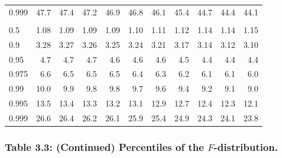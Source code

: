 \documentclass[]{article}
\begin{document}
\begin{table}[H]
\begin{tabular}{lrrrrrrrrrr}
\hspace{1em}0.999 & 47.7 & 47.4 & 47.2 & 46.9 & 46.8 & 46.1 & 45.4 & 44.7 & 44.4 & 44.1\\
\addlinespace[0.3em]
\multicolumn{11}{l}{\textbf{$k_2=5$}}\\
\hspace{1em}0.5 & 1.08 & 1.09 & 1.09 & 1.09 & 1.10 & 1.11 & 1.12 & 1.14 & 1.14 & 1.15\\
\hspace{1em}0.9 & 3.28 & 3.27 & 3.26 & 3.25 & 3.24 & 3.21 & 3.17 & 3.14 & 3.12 & 3.10\\
\hspace{1em}0.95 & 4.7 & 4.7 & 4.7 & 4.6 & 4.6 & 4.6 & 4.5 & 4.4 & 4.4 & 4.4\\
\hspace{1em}0.975 & 6.6 & 6.5 & 6.5 & 6.5 & 6.4 & 6.3 & 6.2 & 6.1 & 6.1 & 6.0\\
\hspace{1em}0.99 & 10.0 & 9.9 & 9.8 & 9.8 & 9.7 & 9.6 & 9.4 & 9.2 & 9.1 & 9.0\\
\hspace{1em}0.995 & 13.5 & 13.4 & 13.3 & 13.2 & 13.1 & 12.9 & 12.7 & 12.4 & 12.3 & 12.1\\
\hspace{1em}0.999 & 26.6 & 26.4 & 26.2 & 26.1 & 25.9 & 25.4 & 24.9 & 24.3 & 24.1 & 23.8\\
\bottomrule
\end{tabular}
\end{table}

\hypertarget{table-3.3-continued-percentiles-of-the-f-distribution.}{%
\subsubsection{\texorpdfstring{Table 3.3: (Continued) Percentiles of the
\(F\)-distribution.}{Table 3.3: (Continued) Percentiles of the F-distribution.}}\label{table-3.3-continued-percentiles-of-the-f-distribution.}}
\end{document}
